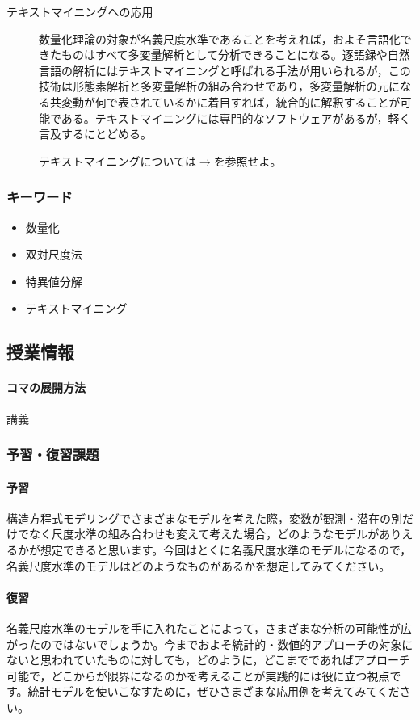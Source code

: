 \begin{description}
	\item[テキストマイニングへの応用] 数量化理論の対象が名義尺度水準であることを考えれば，およそ言語化できたものはすべて多変量解析として分析できることになる。逐語録や自然言語の解析にはテキストマイニングと呼ばれる手法が用いられるが，この技術は形態素解析と多変量解析の組み合わせであり，多変量解析の元になる共変動が何で表されているかに着目すれば，統合的に解釈することが可能である。テキストマイニングには専門的なソフトウェアがあるが，軽く言及するにとどめる。
	      \begin{flushright}
		      テキストマイニングについては$\to$\citet{Higuchu20200406}を参照せよ。
	      \end{flushright}

\end{description}
\subsubsection{キーワード}
\begin{itemize}
	\item 数量化
	\item 双対尺度法
	\item 特異値分解
	\item テキストマイニング
\end{itemize}
\subsection{授業情報}
\paragraph{コマの展開方法}
講義
\subsubsection{予習・復習課題}
\paragraph{予習} 構造方程式モデリングでさまざまなモデルを考えた際，変数が観測・潜在の別だけでなく尺度水準の組み合わせも変えて考えた場合，どのようなモデルがありえるかが想定できると思います。今回はとくに名義尺度水準のモデルになるので，名義尺度水準のモデルはどのようなものがあるかを想定してみてください。
\paragraph{復習} 名義尺度水準のモデルを手に入れたことによって，さまざまな分析の可能性が広がったのではないでしょうか。今までおよそ統計的・数値的アプローチの対象にないと思われていたものに対しても，どのように，どこまでであればアプローチ可能で，どこからが限界になるのかを考えることが実践的には役に立つ視点です。統計モデルを使いこなすために，ぜひさまざまな応用例を考えてみてください。